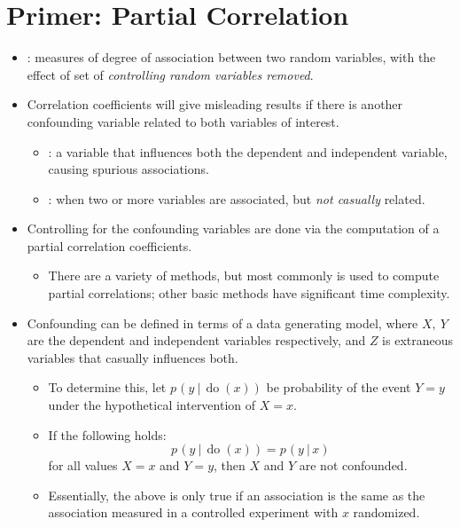 \section{Primer: Partial Correlation}
\begin{itemize}
  \item {}: measures of degree of association between two random variables, with the effect of set of \emph{controlling random variables removed}.
  \item Correlation coefficients will give misleading results if there is another confounding variable related to both variables of interest.
    \begin{itemize}
      \item {}: a variable that influences both the dependent and independent variable, causing spurious associations. 
      \item {}: when two or more variables are associated, but \emph{not casually} related.
    \end{itemize}
  \item Controlling for the confounding variables are done via the computation of a partial correlation coefficients.
    \begin{itemize}
      \item There are a variety of methods, but most commonly \hyperref[Chapter: Regression]{} is used to compute partial correlations; other basic methods have significant time complexity.
    \end{itemize}
  \item Confounding can be defined in terms of a data generating model, where \(X,~Y\) are the dependent and independent variables respectively, and \(Z\) is extraneous variables that casually influences both.
    \begin{itemize}
      \item To determine this, let \(p\hspace{1pt}(y~|\,\operatorname{do}(x))\) be probability of the event \(Y=y\) under the hypothetical intervention of \(X=x\). 
      \item If the following holds:
      \[%
      p\hspace{1pt}(y~|\,\operatorname{do}(x)) = p\hspace{1pt}(y~|\,x)
      \]%
      for all values \(X=x\) and \(Y=y\), then \(X\) and \(Y\) are not confounded.
      \item Essentially, the above is only true if an association is the same as the association measured in a controlled experiment with \(x\) randomized. 
    \end{itemize}


\end{itemize}
